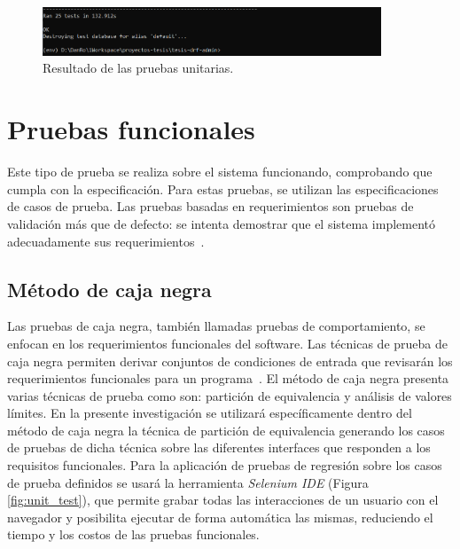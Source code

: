 \begin{figure}[htbp] %
	\centering
	\includegraphics[width=0.9\textwidth]{images/TestCase.PNG} 
	\caption{Resultado de las pruebas unitarias.}
	\label{fig:unit_tests}
\end{figure}

\section{Pruebas funcionales}

Este tipo de prueba se realiza sobre el sistema funcionando, comprobando que cumpla con la especificación. Para estas pruebas, se utilizan las especificaciones de casos de prueba. Las pruebas basadas en requerimientos son pruebas de validación más que de defecto: se intenta demostrar que el sistema implementó adecuadamente sus requerimientos~\cite{sommerville2011software}.

\subsection{Método de caja negra}
Las pruebas de caja negra, también llamadas pruebas de comportamiento, se enfocan en los requerimientos funcionales del software. Las técnicas de prueba de caja negra permiten derivar conjuntos de condiciones de entrada que revisarán los requerimientos funcionales para un programa~\cite{pressman2010practitioner}. El método de caja negra presenta varias técnicas de prueba como son: partición de equivalencia y análisis de valores límites.
En la presente investigación se utilizará específicamente dentro del método de caja negra la técnica de partición de equivalencia generando los casos de pruebas de dicha técnica
sobre las diferentes interfaces que responden a los requisitos funcionales. Para la aplicación de pruebas de regresión sobre los casos de prueba definidos se usará la herramienta \textit{Selenium IDE} (Figura \ref{fig:unit_test}), que permite grabar todas las interacciones de un usuario con el navegador y posibilita ejecutar de forma automática las mismas, reduciendo el tiempo y los costos de las pruebas funcionales.

